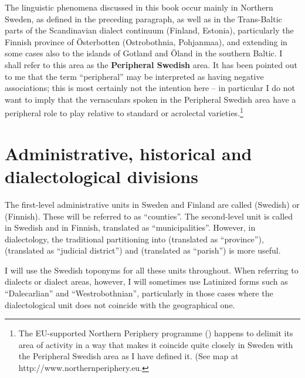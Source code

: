 
The linguistic phenomena discussed in this book occur mainly in Northern Sweden, as defined in the preceding paragraph, as well as in the Trans-Baltic parts of the Scandinavian dialect continuum (Finland, Estonia), particularly the Finnish province of Österbotten (Ostrobothnia, Pohjanmaa), and extending in some cases also to the islands of Gotland and Öland in the southern Baltic. I shall refer to this area as the \textbf{Peripheral Swedish }area. It has been pointed out to me that the term “peripheral” may be interpreted as having negative associations; this is most certainly not the intention here – in particular I do not want to imply that the vernaculars spoken in the Peripheral Swedish area have a peripheral role to play relative to standard or acrolectal varieties.\footnote{ The EU-supported Northern Periphery programme () happens to delimit its area of activity in a way that makes it coincide quite closely in Sweden with the Peripheral Swedish area as I have defined it. (See map at http://www.northernperiphery.eu.} 


\section{ Administrative, historical and dialectological divisions}

The first-level administrative units in Sweden and Finland are called  (Swedish) or  (Finnish). These will be referred to as “counties”. The second-level unit is called  in Swedish and  in Finnish, translated as “municipalities”. However, in dialectology, the traditional partitioning into  (translated as “province”),  (translated as “judicial district”) and  (translated as “parish”) is more useful. 


I will use the Swedish toponyms for all these units throughout. When referring to dialects or dialect areas, however, I will sometimes use Latinized forms such as “Dalecarlian” and “Westrobothnian”, particularly in those cases where the dialectological unit does not coincide with the geographical one.

